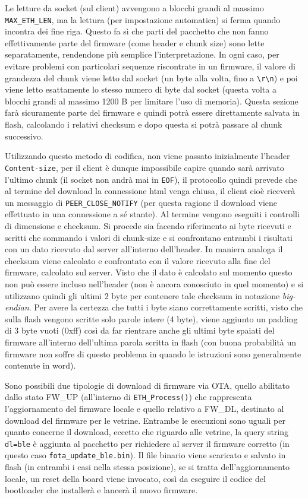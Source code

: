 Le letture da socket (sul client) avvengono a blocchi grandi al massimo \texttt{MAX\_ETH\_LEN}, ma la lettura (per impostazione automatica) si ferma quando incontra dei fine riga. Questo fa s\`i che parti del pacchetto che non fanno effettivamente parte del firmware (come header e chunk size) sono lette separatamente, rendendone pi\`u semplice l'interpretazione. In ogni caso, per evitare problemi con particolari sequenze riscontrate in un firmware, il valore di grandezza del chunk viene letto dal socket (un byte alla volta, fino a \texttt{\textbackslash{r}\textbackslash{n}}) e poi viene letto esattamente lo stesso numero di byte dal socket (questa volta a blocchi grandi al massimo 1200 B per limitare l'uso di memoria). Questa sezione far\`a sicuramente parte del firmware e quindi potr\`a essere direttamente salvata in flash, calcolando i relativi checksum e dopo questa si potr\`a passare al chunk successivo.

Utilizzando questo metodo di codifica, non viene passato inizialmente l'header \texttt{Content-size}, per il client \`e dunque impossibile capire quando sar\`a arrivato l'ultimo chunk (il socket non andr\`a mai in \texttt{EOF}), il protocollo quindi prevede che al termine del download la connessione html venga chiusa, il client cio\`e ricever\`a un messaggio di \texttt{PEER\_CLOSE\_NOTIFY} (per questa ragione il download viene effettuato in una connessione a s\'e stante). Al termine vengono eseguiti i controlli di dimensione e checksum. Si procede sia facendo riferimento ai byte ricevuti e scritti che sommando i valori di chunk-size e si confrontano entrambi i risultati con un dato ricevuto dal server all'interno dell'header. In maniera analoga il checksum viene calcolato e confrontato con il valore ricevuto alla fine del firmware, calcolato sul server. Visto che il dato \`e calcolato sul momento questo non pu\`o essere incluso nell'header (non \`e ancora conosciuto in quel momento) e si utilizzano quindi gli ultimi 2 byte per contenere tale checksum in notazione \textit{big-endian}. Per avere la certezza che tutti i byte siano correttamente scritti, visto che sulla flash vengono scritte solo parole intere (4 byte), viene aggiunto un padding di 3 byte vuoti (0xff) cos\`i da far rientrare anche gli ultimi byte spaiati del firmware all'interno dell'ultima parola scritta in flash (con buona probabilit\`a un firmware non soffre di questo problema in quando le istruzioni sono generalmente contenute in word).

Sono possibili due tipologie di download di firmware via OTA, quello abilitato dallo stato FW\_UP (all'interno di \texttt{ETH\_Process()}) che rappresenta l'aggiornamento del firmware locale e quello relativo a FW\_DL, destinato al download del firmware per le vetrine. Entrambe le esecuzioni sono uguali per quanto concerne il download, eccetto che riguardo alle vetrine, la query string \texttt{dl=ble} \`e aggiunta al pacchetto per richiedere al server il firmware corretto (in questo caso \texttt{fota\_update\_ble.bin}). Il file binario viene scaricato e salvato in flash (in entrambi i casi nella stessa posizione), se si tratta dell'aggiornamento locale, un reset della board viene invocato, cos\`i da eseguire il codice del bootloader che installer\`a e lancer\`a il nuovo firmware.

